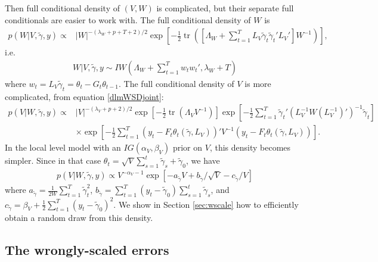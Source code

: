 \documentclass{article}
\DeclareMathOperator{\tr}{tr}
\begin{document}
Then full conditional density of $(V,W)$ is complicated, but their separate full conditionals are easier to work with. The full conditional density of $W$ is
\begin{align*}
  p(W|V,\tilde{\gamma},y)\propto & |W|^{-(\lambda_W + p + T + 2)/2}\exp\left[-\frac{1}{2}\tr\left(\left[\Lambda_W + \sum_{t=1}^TL_V\tilde{\gamma}_t\tilde{\gamma}_t'L_V'\right]W^{-1} \right)\right],
\end{align*}
i.e. 
\begin{align*}
W|V,\tilde{\gamma},y \sim IW\left(\Lambda_W + \sum_{t=1}^Tw_tw_t', \lambda_W + T\right)
\end{align*}
where $w_t = L_V\tilde{\gamma}_t = \theta_t - G_t\theta_{t-1}$. The full conditional density of $V$ is more complicated, from equation \eqref{dlmWSDjoint}:
\begin{align*}
  p(V|W,\tilde{\gamma},y) \propto &  |V|^{-(\lambda_V + p + 2)/2}\exp\left[-\frac{1}{2}\tr\left(\Lambda_VV^{-1}\right)\right] \exp\left[-\frac{1}{2}\sum_{t=1}^T\tilde{\gamma}_t'(L_V^{-1}W(L_V^{-1})')^{-1}\tilde{\gamma}_t\right]\\
  &\times  \exp\left[-\frac{1}{2}\sum_{t=1}^T\left(y_t - F_t\theta_t(\tilde{\gamma},L_V)\right)'V^{-1}\left(y_t - F_t\theta_t(\tilde{\gamma},L_V)\right)\right].
 \end{align*}
In the local level model with an $IG(\alpha_V, \beta_V)$ prior on $V$, this density becomes simpler. Since in that case $\theta_t = \sqrt{V}\sum_{s=1}^t\tilde{\gamma}_s + \tilde{\gamma}_0$, we have
\begin{align*}
p(V|W,\tilde{\gamma},y)\propto V^{-\alpha_V-1}\exp\left[ -a_{\tilde{\gamma}}V + b_{\tilde{\gamma}}/\sqrt{V} -c_{\tilde{\gamma}}/V\right]
\end{align*} 
where $a_{\tilde{\gamma}} = \frac{1}{2W}\sum_{t=1}^T\tilde{\gamma}_t^2$, $b_{\tilde{\gamma}} = \sum_{t=1}^T(y_t - \tilde{\gamma}_0)\sum_{s=1}^t\tilde{\gamma}_s$, and $c_{\tilde{\gamma}} = \beta_V + \frac{1}{2}\sum_{t=1}^T(y_t - \tilde{\gamma}_0)^2$. We show in Section \ref{sec:wscale} how to efficiently obtain a random draw from this density.

\subsection{The wrongly-scaled errors}\label{subsec:WSEs}
\end{document}
